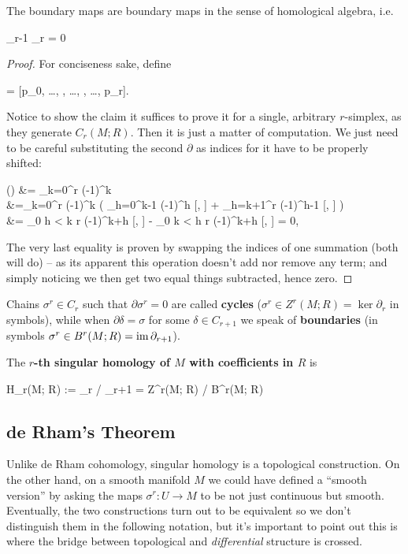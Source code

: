 \begin{lemma}
	The boundary maps are boundary maps in the sense of homological algebra, i.e.
	\begin{eqalign}
		\partial_{r-1} \partial_r = 0
	\end{eqalign}
\end{lemma}
\begin{proof}
	For conciseness sake, define
	\begin{eqalign}
		 = [p_0, \ldots, , \ldots, , \ldots, p_r].
	\end{eqalign}
	Notice to show the claim it suffices to prove it for a single, arbitrary $r$-simplex, as they generate $C_r(M; R)$. Then it is just a matter of computation. We just need to be careful substituting the second $\partial$ as indices for it have to be properly shifted:
	\begin{eqalign}
		\partial (\partial [p_0, \ldots, p_r]) &= \sum_{k=0}^r (-1)^k \partial [\hat{k}]\\
		&=\sum_{k=0}^r (-1)^k \left( \sum_{h=0}^{k-1} (-1)^h [, ] + \sum_{h=k+1}^r (-1)^{h-1} [, ] \right)\\
		&= \sum_{0 \leq h < k \leq r} (-1)^{k+h} [, ] - \sum_{0 \leq k < h \leq r} (-1)^{k+h} [, ] = 0,
	\end{eqalign}
	The very last equality is proven by swapping the indices of one summation (both will do) -- as its apparent this operation doesn't add nor remove any term; and simply noticing we then get two equal things subtracted, hence zero.
\end{proof}

Chains $\sigma^r \in C_r$ such that $\partial \sigma^r = 0$ are called \textbf{cycles} ($\sigma^r \in Z^r(M; R) = \ker \partial_r$ in symbols), while when $\partial \delta = \sigma$ for some $\delta \in C_{r+1}$ we speak of \textbf{boundaries} (in symbols $\sigma^r \in B^r(M; R) = \operatorname{im} \partial_{r+1}$).

\begin{definition}
	The \textbf{$r$-th singular homology of $M$ with coefficients in $R$} is
	\begin{eqalign}
		H_r(M; R) := \ker \partial_r / \im \partial_{r+1} = Z^r(M; R) / B^r(M; R)
	\end{eqalign}
\end{definition}

\subsection{de Rham's Theorem}
\label{subsec:de_rham}
Unlike de Rham cohomology, singular homology is a topological construction. On the other hand, on a smooth manifold $M$ we could have defined a ``smooth version'' by asking the maps $\sigma^r : U \to M$ to be not just continuous but smooth. Eventually, the two constructions turn out to be equivalent so we don't distinguish them in the following notation, but it's important to point out this is where the bridge between topological and \emph{differential} structure is crossed.

